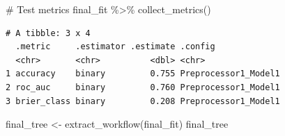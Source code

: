 \documentclass[
]{article}
\newenvironment{Shaded}{\begin{snugshade}}{\end{snugshade}}
\newcommand{\CommentTok}[1]{\textcolor[rgb]{0.37,0.37,0.37}{#1}}
\newcommand{\FunctionTok}[1]{\textcolor[rgb]{0.28,0.35,0.67}{#1}}
\newcommand{\NormalTok}[1]{\textcolor[rgb]{0.00,0.23,0.31}{#1}}
\newcommand{\OtherTok}[1]{\textcolor[rgb]{0.00,0.23,0.31}{#1}}
\newcommand{\SpecialCharTok}[1]{\textcolor[rgb]{0.37,0.37,0.37}{#1}}
\begin{document}
\begin{Shaded}
\begin{Highlighting}[]
\CommentTok{\# Test metrics}
\NormalTok{final\_fit }\SpecialCharTok{\%\textgreater{}\%} 
  \FunctionTok{collect\_metrics}\NormalTok{()}
\end{Highlighting}
\end{Shaded}

\begin{verbatim}
# A tibble: 3 x 4
  .metric     .estimator .estimate .config             
  <chr>       <chr>          <dbl> <chr>               
1 accuracy    binary         0.755 Preprocessor1_Model1
2 roc_auc     binary         0.760 Preprocessor1_Model1
3 brier_class binary         0.208 Preprocessor1_Model1
\end{verbatim}

\begin{Shaded}
\begin{Highlighting}[]
\NormalTok{final\_tree }\OtherTok{\textless{}{-}} \FunctionTok{extract\_workflow}\NormalTok{(final\_fit)}
\NormalTok{final\_tree}
\end{Highlighting}
\end{Shaded}
\end{document}
